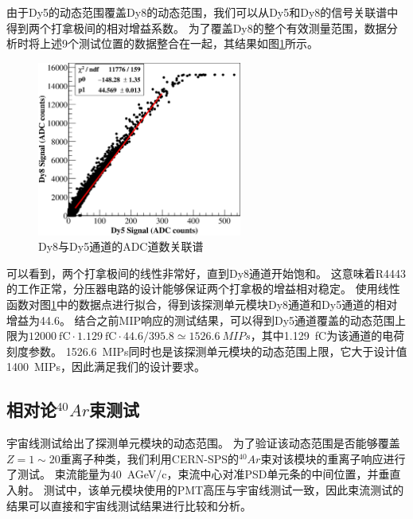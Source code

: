 由于Dy5的动态范围覆盖Dy8的动态范围，我们可以从Dy5和Dy8的信号关联谱中得到两个打拿极间的相对增益系数。
为了覆盖Dy8的整个有效测量范围，数据分析时将上述9个测试位置的数据整合在一起，其结果如图\ref{fig:dynamic_range:dy58}所示。
\begin{figure}[htbp]
	\centering
	\includegraphics[width=0.6\textwidth]{chap/dynamic_range/fig/dy58.eps}
	\caption{Dy8与Dy5通道的ADC道数关联谱}
	\label{fig:dynamic_range:dy58}
\end{figure}
可以看到，两个打拿极间的线性非常好，直到Dy8通道开始饱和。
这意味着R4443的工作正常，分压器电路的设计能够保证两个打拿极的增益相对稳定。
使用线性函数对图\ref{fig:dynamic_range:dy58}中的数据点进行拟合，得到该探测单元模块Dy8通道和Dy5通道的相对增益为44.6。
结合之前MIP响应的测试结果，可以得到Dy5通道覆盖的动态范围上限为$\SI{12000}{\femto\coulomb} \cdot \SI{1.129}{\femto\coulomb} \cdot 44.6/395.8 \simeq \SI{1526.6}{MIPs}$，其中\SI{1.129}{\femto\coulomb}为该通道的电荷刻度参数。
\SI{1526.6}{MIPs}同时也是该探测单元模块的动态范围上限，它大于设计值\SI{1400}{MIPs}，因此满足我们的设计要求。


\subsection{相对论$^{40}Ar$束测试}
\label{sec:dynamic_range:ion_beam}
宇宙线测试给出了探测单元模块的动态范围。
为了验证该动态范围是否能够覆盖$Z=1\sim 20$重离子种类，我们利用CERN-SPS的$^{40}Ar$束对该模块的重离子响应进行了测试。
束流能量为\SI{40}{AGeV/c}，束流中心对准PSD单元条的中间位置，并垂直入射。
测试中，该单元模块使用的PMT高压与宇宙线测试一致，因此束流测试的结果可以直接和宇宙线测试结果进行比较和分析。

